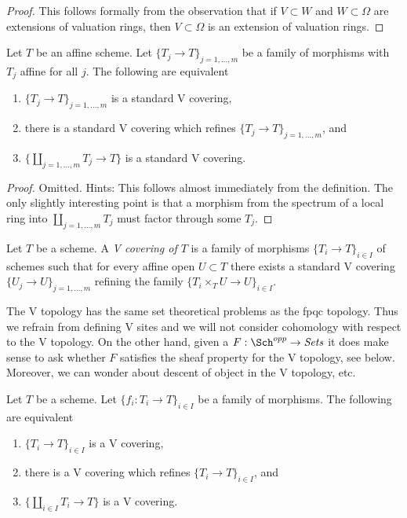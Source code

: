 \begin{proof}
This follows formally from the observation that if
$V \subset W$ and $W \subset \Omega$ are extensions of
valuation rings, then $V \subset \Omega$ is an extension
of valuation rings.
\end{proof}

\begin{lemma}
\label{lemma-refine-standard-V}
Let $T$ be an affine scheme. Let $\{T_j \to T\}_{j = 1, \ldots, m}$
be a family of morphisms with $T_j$ affine for all $j$.
The following are equivalent
\begin{enumerate}
\item $\{T_j \to T\}_{j = 1, \ldots, m}$ is a standard V covering,
\item there is a standard V covering which refines
$\{T_j \to T\}_{j = 1, \ldots, m}$, and
\item $\{\coprod_{j = 1, \ldots, m} T_j \to T\}$ is a standard
V covering.
\end{enumerate}
\end{lemma}

\begin{proof}
Omitted. Hints: This follows almost immediately from the definition.
The only slightly interesting point is that
a morphism from the spectrum of a local ring into
$\coprod_{j = 1, \ldots, m} T_j$ must factor through some $T_j$.
\end{proof}

\begin{definition}
\label{definition-V-covering}
Let $T$ be a scheme. A {\it V covering of $T$} is a family
of morphisms $\{T_i \to T\}_{i \in I}$ of schemes such that for every
affine open $U \subset T$ there exists a standard V covering
$\{U_j \to U\}_{j = 1, \ldots, m}$ refining the family
$\{T_i \times_T U \to U\}_{i \in I}$.
\end{definition}

\noindent
The V topology has the same set theoretical problems as
the fpqc topology. Thus we refrain from defining V sites
and we will not consider cohomology with respect to the V topology.
On the other hand, given a 
$F : \Sch^{opp} \to \textit{Sets}$
it does make sense to ask whether $F$ satisfies the sheaf property
for the V topology, see below.
Moreover, we can wonder about descent of object
in the V topology, etc.

\begin{lemma}
\label{lemma-refine-by-V}
Let $T$ be a scheme. Let $\{f_i : T_i \to T\}_{i \in I}$ be a family
of morphisms. The following are equivalent
\begin{enumerate}
\item $\{T_i \to T\}_{i \in I}$ is a V covering,
\item there is a V covering which refines $\{T_i \to T\}_{i \in I}$, and
\item $\{\coprod_{i \in I} T_i \to T\}$ is a V covering.
\end{enumerate}
\end{lemma}

